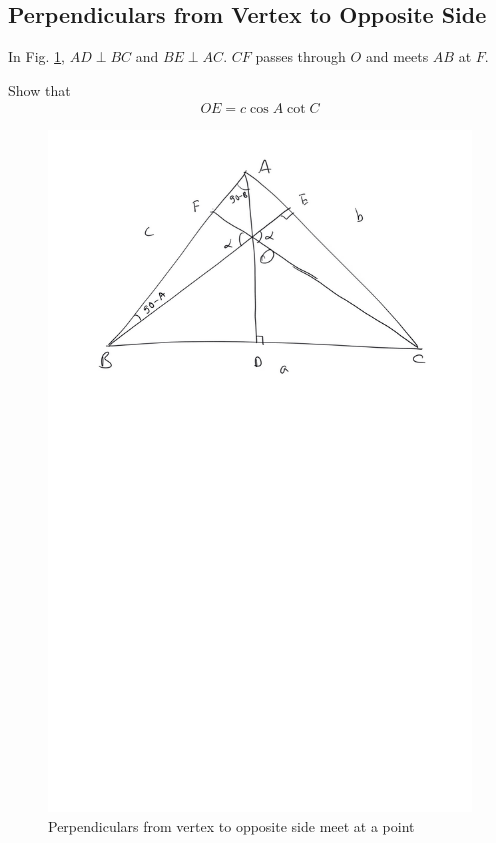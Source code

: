 \subsection{Perpendiculars from Vertex to Opposite Side}
	In Fig. \ref{ch3_perp_triang}, $AD \perp BC$ and $BE \perp AC$. $CF$ passes through $O$ and meets
	$AB$ at $F$.  	
\begin{problem}
	Show that 
	\begin{align}
	OE = c \cos A \cot C
	\end{align}
\end{problem}
	\begin{figure}[!h]
		\begin{center}
			
			\includegraphics[width=\columnwidth]{./figs/ch3_perp_triang}
			\vspace*{-10cm}
		\end{center}
		\caption{Perpendiculars from vertex to opposite side meet at a point}
		\label{ch3_perp_triang}	
	\end{figure}


